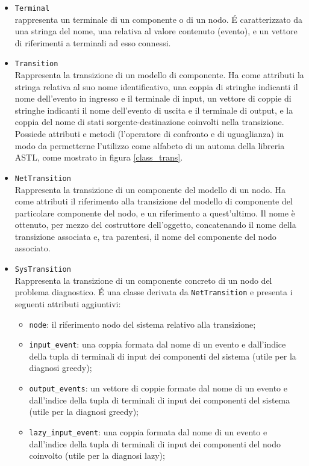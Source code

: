 \begin{itemize}
\item \verb|Terminal|\\
rappresenta un terminale di un componente o di un nodo. \'E caratterizzato da una stringa del nome, una relativa al valore contenuto (evento), e un vettore di riferimenti a terminali ad esso connessi.
\item \verb|Transition|\\ 
Rappresenta la transizione di un modello di componente. Ha come attributi la stringa relativa al suo nome identificativo, una coppia di stringhe indicanti il nome dell'evento in ingresso e il terminale di input, un vettore di coppie di stringhe indicanti il nome dell'evento di uscita e il terminale di output, e la coppia del nome di stati sorgente-destinazione coinvolti nella transizione. 
Possiede attributi e metodi (l'operatore di confronto e di uguaglianza) in modo da permetterne l'utilizzo come alfabeto di un automa della libreria ASTL, come mostrato in figura \ref{class_trans}.
\item \verb|NetTransition|\\
Rappresenta la transizione di un componente del modello di un nodo. Ha come attributi il riferimento alla transizione del modello di componente del particolare componente del nodo, e un riferimento a quest'ultimo. Il nome è ottenuto, per mezzo del costruttore dell'oggetto, concatenando il nome della transizione associata e, tra parentesi, il nome del componente del nodo associato.
\item \verb|SysTransition|\\
Rappresenta la transizione di un componente concreto di un nodo del problema diagnostico. \'E una classe derivata da \verb|NetTransition| e presenta i seguenti attributi aggiuntivi:
\begin{itemize}
\item \verb|node|: il riferimento nodo del sistema relativo alla transizione;
\item \verb|input_event|: una coppia formata dal nome di un evento e dall'indice della tupla di terminali di input dei componenti del sistema (utile per la diagnosi greedy);
\item \verb|output_events|: un vettore di coppie formate dal nome di un evento e dall'indice della tupla di terminali di input dei componenti del sistema (utile per la diagnosi greedy);
\item \verb|lazy_input_event|: una coppia formata dal nome di un evento e dall'indice della tupla di terminali di input dei componenti del nodo coinvolto (utile per la diagnosi lazy);

\end{itemize}
\end{itemize}
